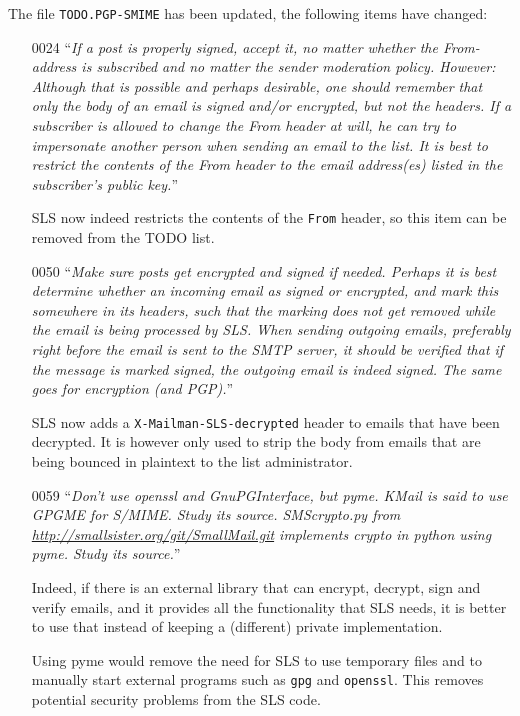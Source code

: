\documentclass[a4]{article}
\newcommand{\iquote}[1]{``\textit{#1}''}
\newcommand{\file}[1]{\texttt{#1}}
\newcommand{\hdr}[1]{\texttt{#1}}
\newcommand{\cmd}[1]{\texttt{#1}}
\begin{document}
The file \file{TODO.PGP-SMIME} has been updated, the following items have changed:

\begin{enumerate}
\item[0024]\iquote{If a post is properly signed, accept it, no matter whether the From-address is subscribed and no matter the sender moderation policy. However:
Although that is possible and perhaps desirable,
one should remember that only the body of an email is signed and/or encrypted, but not the headers.
If a subscriber is allowed to change the From header at will,
he can try to impersonate another person when sending an email to the list.
It is best to restrict the contents of the From header to the email address(es) listed in the subscriber's public key.}

SLS now indeed restricts the contents of the \hdr{From} header, so this item can be removed from the TODO list.

\item[0050]\iquote{Make sure posts get encrypted and signed if needed.
Perhaps it is best determine whether an incoming email as signed or encrypted,
and mark this somewhere in its headers, such that the marking does not get
removed while the email is being processed by SLS.  When sending outgoing
emails, preferably right before the email is sent to the SMTP server, it should
be verified that if the message is marked signed, the outgoing email is indeed
signed. The same goes for encryption (and PGP).}

SLS now adds a \hdr{X-Mailman-SLS-decrypted} header to emails that have been decrypted.
It is however only used to strip the body from emails that are being bounced in plaintext to the list administrator.

\item[0059]\iquote{Don't use openssl and GnuPGInterface, but pyme.
KMail is said to use GPGME for S/MIME. Study its source.
SMScrypto.py from \url{http://smallsister.org/git/SmallMail.git} implements
crypto in python using pyme. Study its source.}

Indeed, if there is an external library that can encrypt, decrypt, sign and verify emails,
and it provides all the functionality that SLS needs,
it is better to use that instead of keeping a (different) private implementation.

Using pyme would remove the need for SLS to use temporary files and to manually start external programs such as \cmd{gpg} and \cmd{openssl}. This removes potential security problems from the SLS code.

\end{enumerate}
\end{document}
